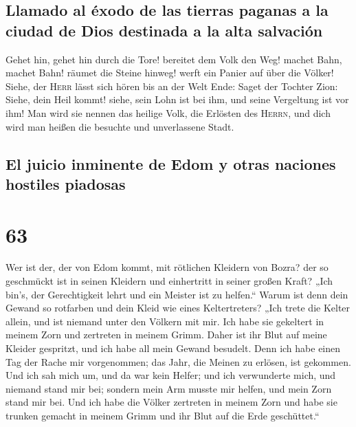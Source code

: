 \hypertarget{llamado-al-uxe9xodo-de-las-tierras-paganas-a-la-ciudad-de-dios-destinada-a-la-alta-salvaciuxf3n}{%
\subsection{Llamado al éxodo de las tierras paganas a la ciudad de Dios
destinada a la alta
salvación}\label{llamado-al-uxe9xodo-de-las-tierras-paganas-a-la-ciudad-de-dios-destinada-a-la-alta-salvaciuxf3n}}

 Gehet hin, gehet hin durch die Tore! bereitet dem Volk
den Weg! machet Bahn, machet Bahn! räumet die Steine hinweg! werft ein
Panier auf über die Völker!  Siehe, der \textsc{Herr}
lässt sich hören bis an der Welt Ende: Saget der Tochter Zion: Siehe,
dein Heil kommt! siehe, sein Lohn ist bei ihm, und seine Vergeltung ist
vor ihm!  Man wird sie nennen das heilige Volk, die
Erlösten des \textsc{Herrn}, und dich wird man heißen die besuchte und
unverlassene Stadt.

\hypertarget{el-juicio-inminente-de-edom-y-otras-naciones-hostiles-piadosas}{%
\subsection{El juicio inminente de Edom y otras naciones hostiles
piadosas}\label{el-juicio-inminente-de-edom-y-otras-naciones-hostiles-piadosas}}

\hypertarget{section-62}{%
\section{63}\label{section-62}}

 Wer ist der, der von Edom kommt, mit rötlichen Kleidern
von Bozra? der so geschmückt ist in seinen Kleidern und einhertritt in
seiner großen Kraft? „Ich bin's, der Gerechtigkeit lehrt und ein Meister
ist zu helfen.``  Warum ist denn dein Gewand so rotfarben
und dein Kleid wie eines Keltertreters?  „Ich trete die
Kelter allein, und ist niemand unter den Völkern mit mir. Ich habe sie
gekeltert in meinem Zorn und zertreten in meinem Grimm. Daher ist ihr
Blut auf meine Kleider gespritzt, und ich habe all mein Gewand besudelt.
 Denn ich habe einen Tag der Rache mir vorgenommen; das
Jahr, die Meinen zu erlösen, ist gekommen.  Und ich sah
mich um, und da war kein Helfer; und ich verwunderte mich, und niemand
stand mir bei; sondern mein Arm musste mir helfen, und mein Zorn stand
mir bei.  Und ich habe die Völker zertreten in meinem Zorn
und habe sie trunken gemacht in meinem Grimm und ihr Blut auf die Erde
geschüttet.``


